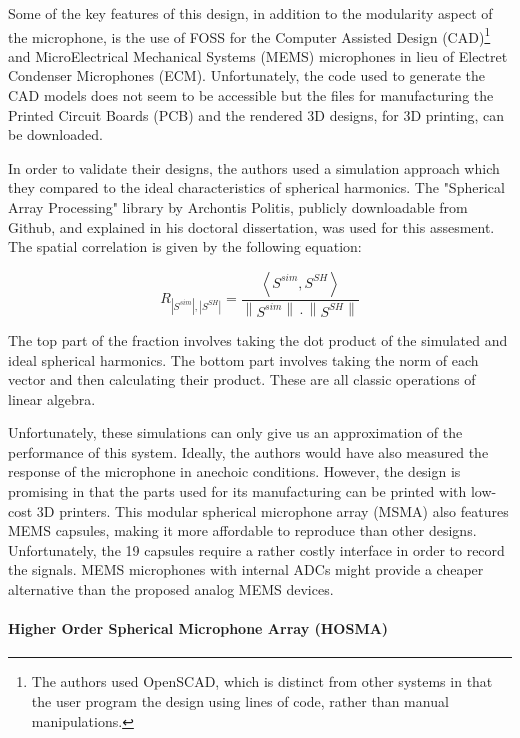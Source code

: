 Some of the key features of this design, in addition to the modularity aspect of the microphone, is the use of FOSS for the Computer Assisted Design (CAD)\footnote{The authors used OpenSCAD, which is distinct from other systems in that the user program the design using lines of code, rather than manual manipulations.} and MicroElectrical Mechanical Systems (MEMS) microphones in lieu of Electret Condenser Microphones (ECM). Unfortunately, the code used to generate the CAD models does not seem to be accessible but the files for manufacturing the Printed Circuit Boards (PCB) and the rendered 3D designs, for 3D printing, can be downloaded. 

In order to validate their designs, the authors used a simulation approach which they compared to the ideal characteristics of spherical harmonics. The "Spherical Array Processing" library by Archontis Politis, publicly downloadable from Github, and explained in his doctoral dissertation, was used for this assesment. The spatial correlation is given by the following equation: 

\begin{equation}
R_{\left|S^{s i m}\right|,\left|S^{S H}\right|}=\frac{\left\langle S^{s i m}, S^{S H}\right\rangle}{\left\|S^{s i m}\right\| \cdot\left\|S^{S H}\right\|}
\end{equation}

The top part of the fraction involves taking the dot product of the simulated and ideal spherical harmonics. The bottom part involves taking the norm of each vector and then calculating their product. These are all classic operations of linear algebra. 

Unfortunately, these simulations can only give us an approximation of the performance of this system. Ideally, the authors would have also measured the response of the microphone in anechoic conditions. However, the design is promising in that the parts used for its manufacturing can be printed with low-cost 3D printers. This modular spherical microphone array (MSMA) also features MEMS capsules, making it more affordable to reproduce than other designs. Unfortunately, the 19 capsules require a rather costly interface in order to record the signals. MEMS microphones with internal ADCs might provide a cheaper alternative than the proposed analog MEMS devices. 

\paragraph{Higher Order Spherical Microphone Array (HOSMA)}

